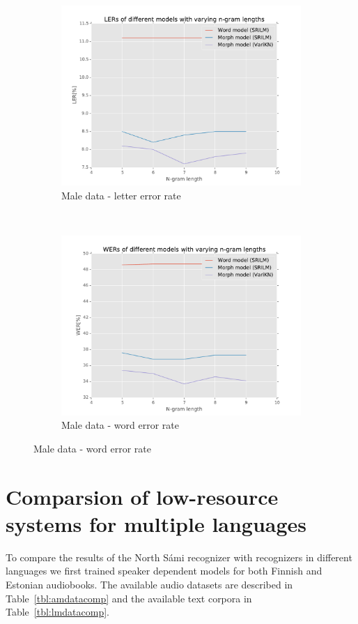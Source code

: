 \documentclass[b5paper]{article}
\newcommand{\ns}{{North Sámi }}
\begin{document}
\begin{figure}[h!]
\begin{subfigure}[b]{.4\textwidth}
\includegraphics[width=\textwidth]{figures/smeM-complete_wikipedia-ler}
\caption{Male data - letter error rate}
\end{subfigure}~
\begin{subfigure}[b]{.4\textwidth}
\includegraphics[width=\textwidth]{figures/smeM-complete_wikipedia-wer}
\caption{Male data - word error rate}
\end{subfigure}

\end{figure}

\section{Comparsion of low-resource systems for multiple languages}
\label{sec:compexp}
To compare the results of the \ns recognizer with recognizers in different languages we first trained speaker dependent models for both Finnish and Estonian audiobooks. The available audio datasets are described in Table~\ref{tbl:amdatacomp} and the available text corpora in Table~\ref{tbl:lmdatacomp}.
\end{document}

